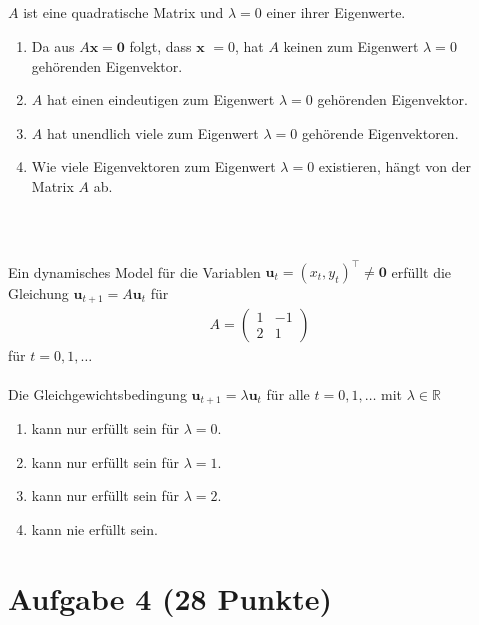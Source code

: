 \subsection*{}
$A$ ist eine quadratische Matrix und $\lambda = 0 $ einer ihrer Eigenwerte.
\renewcommand{\labelenumi}{(\alph{enumi})}
\begin{enumerate}
\item 
Da aus $A \textbf{x} = \textbf{0}$ folgt, dass $\textbf{x } = 0$, hat $A$ keinen zum Eigenwert $ \lambda = 0$ gehörenden Eigenvektor.
\item
$A$ hat einen eindeutigen zum Eigenwert $\lambda = 0$ gehörenden Eigenvektor.
\item
$A$ hat unendlich viele zum Eigenwert $\lambda = 0$ gehörende Eigenvektoren.
\item
Wie viele Eigenvektoren zum Eigenwert $\lambda = 0$ existieren, hängt von der Matrix $A$ ab.
\end{enumerate}
\ \\
\subsection*{}
Ein dynamisches Model für die Variablen $\textbf{u}_t = (x_t , y_t)^\top \neq \textbf{0}$ erfüllt die Gleichung
$\textbf{u}_{t+1} = A \textbf{u}_t$ für
\begin{align*}
A = 
\begin{pmatrix}
1 & -1\\
2 & 1
\end{pmatrix}
\end{align*}
für $t = 0,1,\dots$ \\
\\
Die Gleichgewichtsbedingung $\textbf{u}_{t+1} = \lambda \textbf{u}_t$ für alle $t = 0,1,\dots$ mit $\lambda \in \mathbb{R}$
\renewcommand{\labelenumi}{(\alph{enumi})}
\begin{enumerate}
\item 
kann nur erfüllt sein für $\lambda = 0$.
\item
kann nur erfüllt sein für $\lambda = 1$.
\item
kann nur erfüllt sein für $\lambda = 2$.
\item
kann nie erfüllt sein.
\end{enumerate}


\newpage
\section*{Aufgabe 4 (28 Punkte)}
\vspace{0.4cm}

